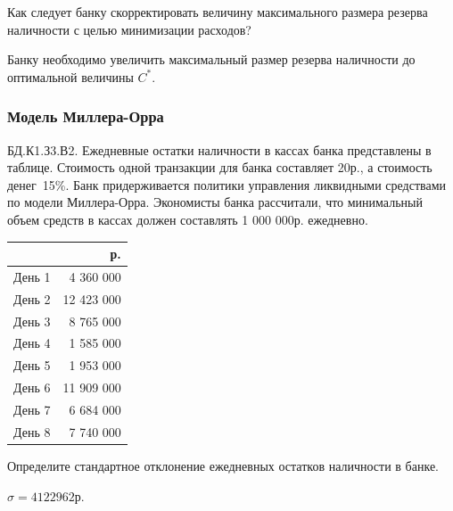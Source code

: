 \documentclass[12pt, table, a4paper,twoside]{exam}
\begin{document}
\begin{questions}
\begin{subparts}
\begin{solution}[12em]
	\end{solution}

	\subpart[2] Как следует банку скорректировать величину максимального размера резерва наличности с целью минимизации расходов?
	
	\begin{solution}[12em]
		Банку необходимо увеличить максимальный размер резерва наличности до оптимальной величины $C^*$.
	\end{solution}
		
	\end{subparts}
	\addpoints

\vfill\null\pagebreak
\subsubsection{Модель Миллера-Орра}
\question[20] БД.К1.З3.В2. Ежедневные остатки наличности в кассах банка представлены в таблице. Стоимость одной транзакции для банка составляет 20р., а стоимость денег~15\%. Банк придерживается политики управления ликвидными средствами по модели Миллера-Орра. Экономисты банка рассчитали, что минимальный объем средств в кассах должен составлять 1 000 000р. ежедневно.
\begin{table}[htbp]
	\centering
	\begin{tabular}{lr}
		&р.\\
		\toprule
		День 1 &      4 360 000    \\
		День 2 &    12 423 000    \\
		День 3 &      8 765 000    \\
		День 4 &      1 585 000    \\
		День 5 &      1 953 000    \\
		День 6 &    11 909 000    \\
		День 7 &      6 684 000    \\
		День 8 &      7 740 000    \\
		\bottomrule
	\end{tabular}%
	\label{tab:addlabel}%
\end{table}%

\noaddpoints

\begin{subparts}
	\subpart[5] Определите стандартное отклонение ежедневных остатков наличности в банке.
	
	\begin{solution}[12em]
		$\sigma=4 122 962\text{р.}$
	\end{solution}


\end{subparts}
\end{questions}
\end{document}
